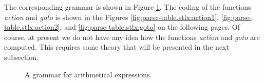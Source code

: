The corresponding grammar is shown in Figure \ref{fig:Expr.grammar}.  The coding of the
functions \textsl{action} and \textsl{goto} is shown in the Figures
\ref{fig:parse-table.stlx:action1}, \ref{fig:parse-table.stlx:action2}, and
\ref{fig:parse-table.stlx:goto} on the following pages.   Of course, at present we do not have any
idea how the functions \textsl{action} and \textsl{goto} are computed.  This requires some theory
that will be presented in the next subsection.


\begin{figure}[htbp]
  \begin{center}    
  \end{center}
  \caption{A grammar for arithmetical expressions.}
  \label{fig:Expr.grammar}
\end{figure}

